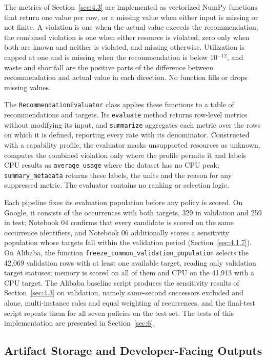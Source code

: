 \documentclass{IEEEtran}
\begin{document}
The metrics of Section~\ref{sec:4.3} are implemented as vectorized NumPy functions that return one value per row, or a missing value when either input is missing or not finite. A violation is one when the actual value exceeds the recommendation; the combined violation is one when either resource is violated, zero only when both are known and neither is violated, and missing otherwise. Utilization is capped at one and is missing when the recommendation is below 10$^{-1}$$^{2}$, and waste and shortfall are the positive parts of the difference between recommendation and actual value in each direction. No function fills or drops missing values.

The \texttt{RecommendationEvaluator} class applies these functions to a table of recommendations and targets. Its \texttt{evaluate} method returns row-level metrics without modifying its input, and \texttt{summarize} aggregates each metric over the rows on which it is defined, reporting every rate with its denominator. Constructed with a capability profile, the evaluator masks unsupported resources as unknown, computes the combined violation only where the profile permits it and labels CPU results as \texttt{average\_usage} where the dataset has no CPU peak; \texttt{summary\_metadata} returns these labels, the units and the reason for any suppressed metric. The evaluator contains no ranking or selection logic.

Each pipeline fixes its evaluation population before any policy is scored. On Google, it consists of the occurrences with both targets, 329 in validation and 259 in test; Notebook 04 confirms that every candidate is scored on the same occurrence identifiers, and Notebook 06 additionally scores a sensitivity population whose targets fall within the validation period (Section~\ref{sec:4.1.7}). On Alibaba, the function \texttt{freeze\_common\_validation\_population} selects the 42,069 validation rows with at least one available target, reading only validation target statuses; memory is scored on all of them and CPU on the 41,913 with a CPU target. The Alibaba baseline script produces the sensitivity results of Section~\ref{sec:4.3} on validation, namely same-second successors excluded and alone, multi-instance roles and equal weighting of recurrences, and the final-test script repeats them for all seven policies on the test set. The tests of this implementation are presented in Section~\ref{sec:6}.

\subsection{Artifact Storage and Developer-Facing Outputs}\label{sec:5.6}
\end{document}

